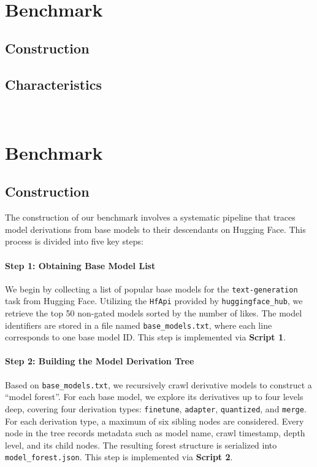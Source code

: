 \\
\section{Benchmark}

\subsection{Construction}



\subsection{Characteristics}
\\
\section{Benchmark}

\subsection{Construction}

The construction of our benchmark involves a systematic pipeline that traces model derivations from base models to their descendants on Hugging Face. This process is divided into five key steps:

\paragraph{Step 1: Obtaining Base Model List}
We begin by collecting a list of popular base models for the \texttt{text-generation} task from Hugging Face. Utilizing the \texttt{HfApi} provided by \texttt{huggingface\_hub}, we retrieve the top 50 non-gated models sorted by the number of likes. The model identifiers are stored in a file named \texttt{base\_models.txt}, where each line corresponds to one base model ID. This step is implemented via \textbf{Script 1}.

\paragraph{Step 2: Building the Model Derivation Tree}
Based on \texttt{base\_models.txt}, we recursively crawl derivative models to construct a “model forest”. For each base model, we explore its derivatives up to four levels deep, covering four derivation types: \texttt{finetune}, \texttt{adapter}, \texttt{quantized}, and \texttt{merge}. For each derivation type, a maximum of six sibling nodes are considered. Every node in the tree records metadata such as model name, crawl timestamp, depth level, and its child nodes. The resulting forest structure is serialized into \texttt{model\_forest.json}. This step is implemented via \textbf{Script 2}.

